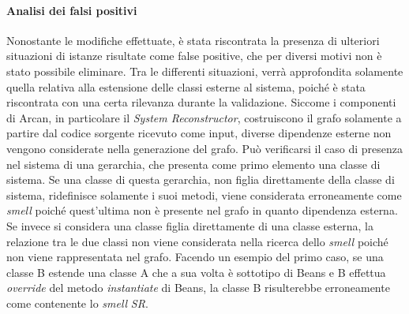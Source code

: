         \paragraph{Analisi dei falsi positivi}
            Nonostante le modifiche effettuate, è stata riscontrata la presenza di ulteriori situazioni di istanze risultate come false positive, che per diversi motivi non è stato possibile eliminare.
            Tra le differenti situazioni, verrà approfondita solamente quella relativa alla estensione delle classi esterne al sistema, poiché è stata riscontrata con una certa rilevanza durante la validazione. 
            Siccome i componenti di Arcan, in particolare il \textit{System Reconstructor}, costruiscono il grafo solamente a partire dal codice sorgente ricevuto come input, diverse dipendenze esterne non vengono considerate nella generazione del grafo.
            Può verificarsi il caso di presenza nel sistema di una gerarchia, che presenta come primo elemento una classe di sistema.
            Se una classe di questa gerarchia, non figlia direttamente della classe di sistema, ridefinisce solamente i suoi metodi, viene considerata erroneamente come \textit{smell} poiché quest'ultima non è presente nel grafo in quanto dipendenza esterna. Se invece si considera una classe figlia direttamente di una classe esterna, la relazione tra le due classi non viene considerata nella ricerca dello \textit{smell} poiché non viene rappresentata nel grafo.
            Facendo un esempio del primo caso, se una classe B estende una classe A che a sua volta è sottotipo di Beans \cite{javadocWebsite} e B effettua \textit{override} del metodo \textit{instantiate} di Beans, la classe B risulterebbe erroneamente come contenente lo \textit{smell} \textit{SR}.
            

